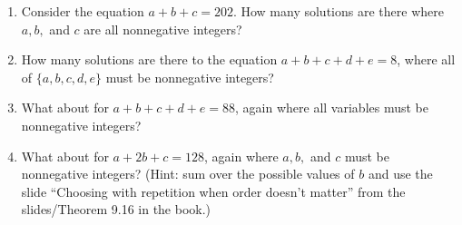 \documentclass[11pt, oneside]{article}   	%
\begin{document}
\begin{enumerate}
\item Consider the equation $a+b+c=202$. How many solutions are there where $a,b,$ and $c$ are all nonnegative integers?
\item How many solutions are there to the equation $a+b+c+d+e=8$, where all of $\{a,b,c,d,e\}$ must be nonnegative integers?
\item What about for $a+b+c+d+e=88$, again where all variables must be nonnegative integers?
\item What about for $a+2b+c=128$, again where $a,b,$ and $c$ must be nonnegative integers? (Hint: sum over the possible values of $b$ and use the slide ``Choosing with repetition when order doesn’t matter'' from the slides/Theorem 9.16 in the book.)


\end{enumerate}
\end{document}
